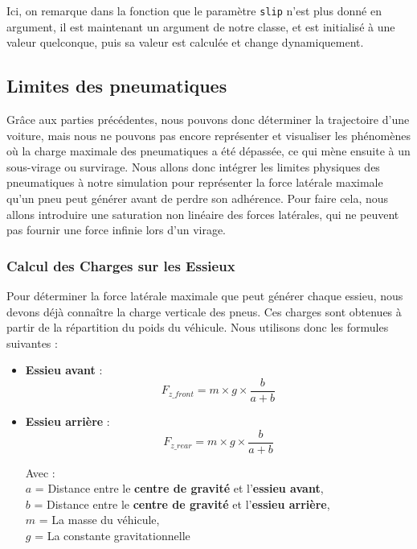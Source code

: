 Ici, on remarque dans la fonction que le paramètre \texttt{slip} n'est plus donné en argument, il est maintenant un argument de notre classe, et est initialisé à une valeur quelconque, puis sa valeur est calculée et change dynamiquement.

\subsection{Limites des pneumatiques}

Grâce aux parties précédentes, nous pouvons donc déterminer la trajectoire d'une voiture, mais nous ne pouvons pas encore représenter et visualiser les phénomènes où la charge maximale des pneumatiques a été dépassée, ce qui mène ensuite à un sous-virage ou survirage. Nous allons donc intégrer les limites physiques des pneumatiques à notre simulation pour représenter la force latérale maximale qu'un pneu peut générer avant de perdre son adhérence. Pour faire cela, nous allons introduire une saturation non linéaire des forces latérales, qui ne peuvent pas fournir une force infinie lors d'un virage.

\subsubsection{Calcul des Charges sur les Essieux}

Pour déterminer la force latérale maximale que peut générer chaque essieu, nous devons déjà connaître la charge verticale des pneus. Ces charges sont obtenues à partir de la répartition du poids du véhicule. Nous utilisons donc les formules suivantes :

\begin{itemize}
\item \textbf{Essieu avant} :
$$F_{z\_front} = m \times g \times \frac{b}{a+b}$$
\item \textbf{Essieu arrière} :
$$F_{z\_rear} = m \times g \times \frac{b}{a+b}$$

Avec :\\
$a$ = Distance entre le \textbf{centre de gravité} et l'\textbf{essieu avant},\\
$b$ = Distance entre le \textbf{centre de gravité} et l'\textbf{essieu arrière},\\
$m$ = La masse du véhicule, \\
$g$ = La constante gravitationnelle \\
\end{itemize}

